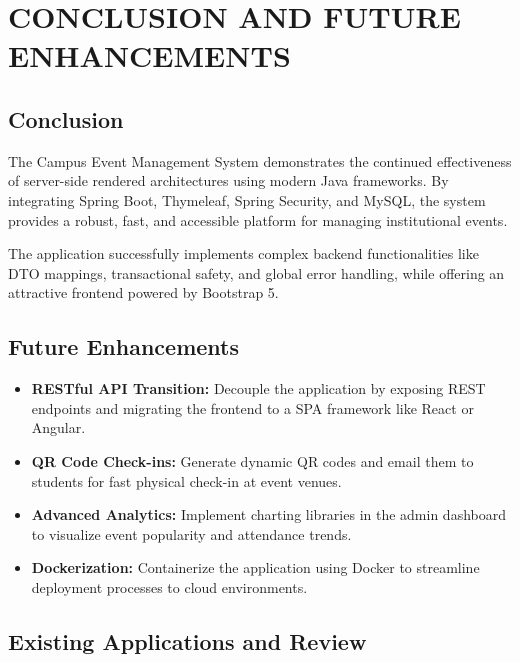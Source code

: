 \documentclass[12pt]{report}
\begin{document}
\chapter{CONCLUSION AND FUTURE ENHANCEMENTS}

\section{Conclusion}

The Campus Event Management System demonstrates the continued effectiveness of server-side rendered architectures using modern Java frameworks. By integrating Spring Boot, Thymeleaf, Spring Security, and MySQL, the system provides a robust, fast, and accessible platform for managing institutional events.

The application successfully implements complex backend functionalities like DTO mappings, transactional safety, and global error handling, while offering an attractive frontend powered by Bootstrap 5.

\section{Future Enhancements}

\begin{itemize}

\item \textbf{RESTful API Transition:} Decouple the application by exposing REST endpoints and migrating the frontend to a SPA framework like React or Angular.

\item \textbf{QR Code Check-ins:} Generate dynamic QR codes and email them to students for fast physical check-in at event venues.

\item \textbf{Advanced Analytics:} Implement charting libraries in the admin dashboard to visualize event popularity and attendance trends.

\item \textbf{Dockerization:} Containerize the application using Docker to streamline deployment processes to cloud environments.

\end{itemize}

\section{Existing Applications and Review}
\end{document}
